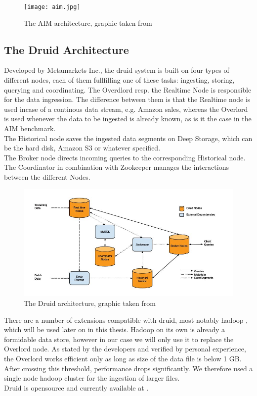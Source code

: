 \documentclass[11pt,singlecolumn]{scrartcl}
\begin{document}
\begin{figure}[h]
\texttt{[image: aim.jpg]}
\caption{The AIM architecture, graphic taken from \cite{aim}}
\end{figure}

\clearpage

\subsection{The Druid Architecture}
Developed by Metamarkets Inc., the druid system  \cite{druid} is built on four types of different nodes, each of them fullfilling one of these tasks: ingesting, storing, querying and coordinating. The Overdlord resp. the Realtime Node is responsible for the data ingression. The difference between them is that the Realtime node is used incase of a continous data stream, e.g. Amazon sales, whereas the Overlord is used whenever the data to be ingested is already known, as is it the case in the AIM benchmark.\\
The Historical node saves the ingested data segments on Deep Storage, which can be the hard disk, Amazon S3 or whatever specified.\\
The Broker node directs incoming queries to the corresponding Historical node.\\
The Coordinator in combination with Zookeeper \cite{zoo} manages the interactions between the different Nodes.\\


\begin{figure}[h]
\includegraphics[scale=0.7]{druid.jpg}
\caption{The Druid architecture, graphic taken from \cite{druid}}
\end{figure}

There are a number of extensions compatible with druid, most notably hadoop \cite{hadoop}, which will be used later on in this thesis. Hadoop on its own is already a formidable data store, however in our case we will only use it to replace the Overlord node. As stated by the developers and verified by personal experience, the Overlord works efficient only as long as size of the data file is below 1 GB. After crossing this threshold, performance drops significantly. We therefore used a single node hadoop cluster for the ingestion of larger files.
\\[1cm]
Druid is opensource and currently available at \cite{druidon}.
\end{document}
